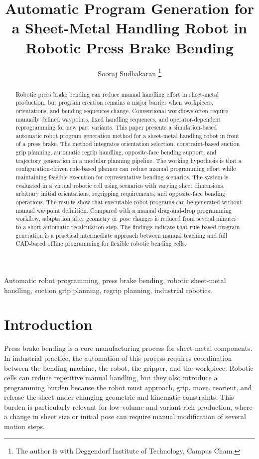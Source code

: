 \documentclass[journal]{IEEEtran}
\title{Automatic Program Generation for a Sheet-Metal Handling Robot in Robotic Press Brake Bending}
\author{Sooraj Sudhakaran%
\thanks{The author is with Deggendorf Institute of Technology, Campus Cham.}}
\begin{document}
\maketitle

\begin{abstract}
Robotic press brake bending can reduce manual handling effort in sheet-metal production, but program creation remains a major barrier when workpieces, orientations, and bending sequences change. Conventional workflows often require manually defined waypoints, fixed handling sequences, and operator-dependent reprogramming for new part variants. This paper presents a simulation-based automatic robot program generation method for a sheet-metal handling robot in front of a press brake. The method integrates orientation selection, constraint-based suction grip planning, automatic regrip handling, opposite-face bending support, and trajectory generation in a modular planning pipeline. The working hypothesis is that a configuration-driven rule-based planner can reduce manual programming effort while maintaining feasible execution for representative bending scenarios. The system is evaluated in a virtual robotic cell using scenarios with varying sheet dimensions, arbitrary initial orientations, regripping requirements, and opposite-face bending operations. The results show that executable robot programs can be generated without manual waypoint definition. Compared with a manual drag-and-drop programming workflow, adaptation after geometry or pose changes is reduced from several minutes to a short automatic recalculation step. The findings indicate that rule-based program generation is a practical intermediate approach between manual teaching and full CAD-based offline programming for flexible robotic bending cells.
\end{abstract}

\begin{IEEEkeywords}
Automatic robot programming, press brake bending, robotic sheet-metal handling, suction grip planning, regrip planning, industrial robotics.
\end{IEEEkeywords}

\section{Introduction}
Press brake bending is a core manufacturing process for sheet-metal components. In industrial practice, the automation of this process requires coordination between the bending machine, the robot, the gripper, and the workpiece. Robotic cells can reduce repetitive manual handling, but they also introduce a programming burden because the robot must approach, grip, move, reorient, and release the sheet under changing geometric and kinematic constraints. This burden is particularly relevant for low-volume and variant-rich production, where a change in sheet size or initial pose can require manual modification of several motion steps.
\end{document}
